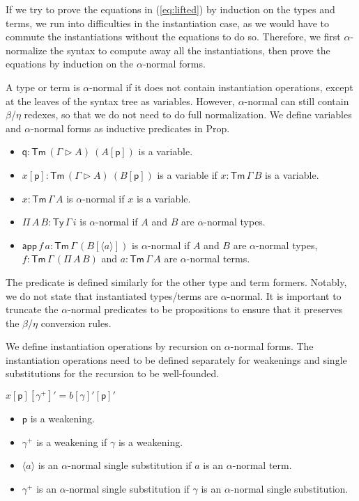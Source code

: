 \documentclass[sigplan,10pt,anonymous,review]{acmart}\settopmatter{printfolios=true,printccs=false,printacmref=false}
\newcommand{\Ty}{\mathsf{Ty}}
\newcommand{\Tm}{\mathsf{Tm}}
\newcommand{\p}{\mathsf{p}}
\newcommand{\q}{\mathsf{q}}
\newcommand{\ext}{\mathop{\triangleright}}
\newcommand{\app}{\mathsf{app}}
\begin{document}
If we try to prove the equations in (\ref{eq:lifted}) by induction on the types
and terms, we run into difficulties in the instantiation case, as we would have
to commute the instantiations without the equations to do so. Therefore, we
first $\alpha$-normalize the syntax to compute away all the instantiations, then
prove the equations by induction on the $\alpha$-normal forms.

A type or term is $\alpha$-normal if it does not contain instantiation
operations, except at the leaves of the syntax tree as variables. However,
$\alpha$-normal can still contain $\beta$/$\eta$ redexes, so that we do not need
to do full normalization. We define variables and $\alpha$-normal forms as
inductive predicates in Prop.
\begin{itemize}
  \item $\q:\Tm\,(\Gamma\ext A)\ (A[\p])$ is a variable.
  \item $x[\p]:\Tm\,(\Gamma\ext A)\ (B[\p])$ is a variable if $x:\Tm\,\Gamma\,B$
  is a variable.
  \item $x:\Tm\,\Gamma\,A$ is $\alpha$-normal if $x$ is a variable.
  \item $\Pi\,A\,B:\Ty\,\Gamma\,i$ is $\alpha$-normal if $A$ and $B$ are
  $\alpha$-normal types.
  \item $\app\,f\,a:\Tm\,\Gamma\,(B[\langle a \rangle])$ is $\alpha$-normal if
  $A$ and $B$ are $\alpha$-normal types, $f:\Tm\,\Gamma\,(\Pi\,A\,B)$ and
  $a:\Tm\,\Gamma\,A$ are $\alpha$-normal terms.
\end{itemize}
The predicate is defined similarly for the other type and term formers. Notably,
we do not state that instantiated types/terms are $\alpha$-normal. It is
important to truncate the $\alpha$-normal predicates to be propositions to
ensure that it preserves the $\beta$/$\eta$ conversion rules.

We define instantiation operations by recursion on $\alpha$-normal forms. The
instantiation operations need to be defined separately for weakenings and single
substitutions for the recursion to be well-founded.

$x[\p][\gamma^+]' = b[\gamma]'[\p]'$

\begin{itemize}
  \item $\p$ is a weakening.
  \item $\gamma^+$ is a weakening if $\gamma$ is a weakening.
  \item $\langle a \rangle$ is an $\alpha$-normal single substitution if $a$ is an
  $\alpha$-normal term.
  \item $\gamma^+$ is an $\alpha$-normal single substitution if $\gamma$ is an
  $\alpha$-normal single substitution.
\end{itemize}
\end{document}
